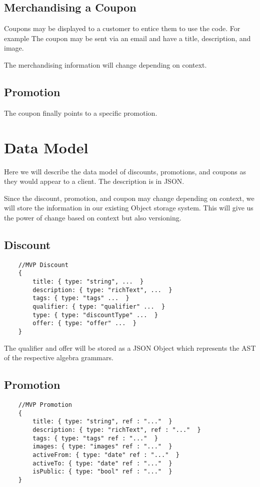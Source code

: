 \documentclass[11pt]{article}
\begin{document}
\subsection{Merchandising a Coupon}

Coupons may be displayed to a customer to entice them to use the code. For example
The coupon may be sent via an email and have a title, description, and image.

The merchandising information will change depending on context.

\subsection{Promotion}

The coupon finally points to a specific promotion.

\section{Data Model}

Here we will describe the data model of discounts, promotions, and coupons as
they would appear to a client. The description is in JSON. 

Since the discount, promotion, and coupon may change depending on context, 
we will store the information in our existing Object storage system.
This will give us the power of change  based on context but also versioning.

\subsection{Discount}

\begin{lstlisting}
    //MVP Discount
    {
        title: { type: "string", ...  }
        description: { type: "richText", ...  }
        tags: { type: "tags" ...  }
        qualifier: { type: "qualifier" ...  }
        type: { type: "discountType" ...  }
        offer: { type: "offer" ...  }
    }
\end{lstlisting}

The qualifier and offer will be stored as a JSON Object which represents the AST
of the respective algebra grammars.

\subsection{Promotion}

\begin{lstlisting}
    //MVP Promotion
    {
        title: { type: "string", ref : "..."  }
        description: { type: "richText", ref : "..."  }
        tags: { type: "tags" ref : "..."  }
        images: { type: "images" ref : "..."  }
        activeFrom: { type: "date" ref : "..."  }
        activeTo: { type: "date" ref : "..."  }
        isPublic: { type: "bool" ref : "..."  }
    }
\end{lstlisting}
\end{document}
